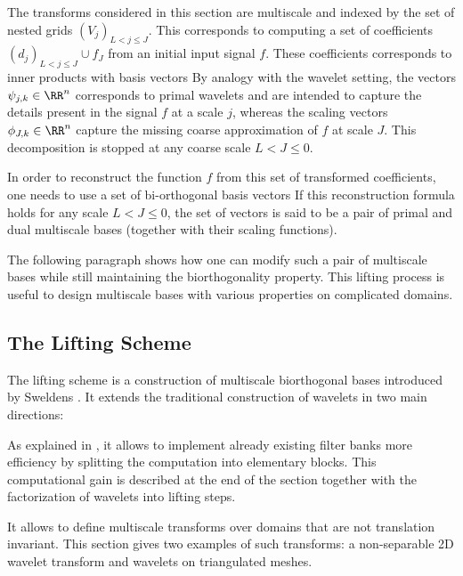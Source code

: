 The transforms considered in this section are multiscale and indexed by the set of nested grids $(V_j)_{L < j \leq J}$. This corresponds to computing a set of coefficients $(d_j)_{L <j \leq J} \cup f_J$ from an initial input signal $f$. These coefficients corresponds to inner products with basis vectors
By analogy with the wavelet setting, the vectors $\psi_{j,k} \in \RR^n$ corresponds to primal wavelets and are intended to capture the details present in the signal $f$ at a scale $j$, whereas the scaling vectors $\phi_{J,k} \in \RR^n$ capture the missing coarse approximation of $f$ at scale $J$. This decomposition is stopped at any coarse scale $L < J \leq 0$. 

In order to reconstruct the function $f$ from this set of transformed coefficients, one needs to use a set of bi-orthogonal basis vectors 
If this reconstruction formula holds for any scale $L<J\leq 0$, the set of vectors
is said to be a pair of primal and dual multiscale bases (together with their scaling functions).

The following paragraph shows how one can modify such a pair of multiscale bases while still maintaining the biorthogonality property. This lifting process is useful to design multiscale bases with various properties on complicated domains.

\subsection{The Lifting Scheme}

The lifting scheme is a construction of multiscale biorthogonal bases introduced by Sweldens \cite{sweldens-lifting,sweldens-listing-second-generation}. It extends the traditional construction of wavelets in two main directions:
\begin{rs}
	\item As explained in \cite{sweldens-factoring}, it allows to implement already existing filter banks more efficiency by splitting the computation into elementary blocks. This computational gain is described at the end of the section together with the factorization of wavelets into lifting steps.
	\item It allows to define multiscale transforms over domains that are not translation invariant. This section gives two examples of such transforms: a non-separable 2D wavelet transform and wavelets on triangulated meshes. 
\end{rs}

